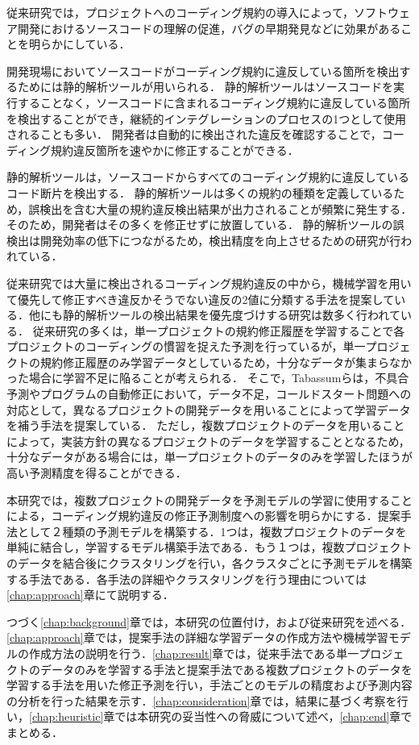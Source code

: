\documentclass[11pt,dvipdfmx]{jreport}
\begin{document}
従来研究では，プロジェクトへのコーディング規約の導入によって，ソフトウェア開発におけるソースコードの理解の促進，バグの早期発見などに効果があることを明らかにしている\cite{Beller2}\cite{Johnson}\cite{Beller}．

開発現場においてソースコードがコーディング規約に違反している箇所を検出するためには静的解析ツールが用いられる．
静的解析ツールはソースコードを実行することなく，ソースコードに含まれるコーディング規約に違反している箇所を検出することができ，継続的インテグレーションのプロセスの1つとして使用されることも多い．
開発者は自動的に検出された違反を確認することで，コーディング規約違反箇所を速やかに修正することができる．

静的解析ツールは，ソースコードからすべてのコーディング規約に違反しているコード断片を検出する．
静的解析ツールは多くの規約の種類を定義しているため，誤検出を含む大量の規約違反検出結果が出力されることが頻繁に発生する．
そのため，開発者はその多くを修正せずに放置している．
静的解析ツールの誤検出は開発効率の低下につながるため，検出精度を向上させるための研究が行われている\cite{Nguyen}．

従来研究では大量に検出されるコーディング規約違反の中から，機械学習を用いて優先して修正すべき違反かそうでない違反の2値に分類する手法を提案している\cite{JyuraiPre}．他にも静的解析ツールの検出結果を優先度づけする研究は数多く行われている．
従来研究の多くは，単一プロジェクトの規約修正履歴を学習することで各プロジェクトのコーディングの慣習を捉えた予測を行っているが，単一プロジェクトの規約修正履歴のみ学習データとしているため，十分なデータが集まらなかった場合に学習不足に陥ることが考えられる．
そこで，Tabassumらは，不具合予測やプログラムの自動修正において，データ不足，コールドスタート問題への対応として，異なるプロジェクトの開発データを用いることによって学習データを補う手法を提案している\cite{Tabassum}．
ただし，複数プロジェクトのデータを用いることによって，実装方針の異なるプロジェクトのデータを学習することとなるため，十分なデータがある場合には，単一プロジェクトのデータのみを学習したほうが高い予測精度を得ることができる．

本研究では，複数プロジェクトの開発データを予測モデルの学習に使用することによる，コーディング規約違反の修正予測制度への影響を明らかにする．提案手法として２種類の予測モデルを構築する．1つは，複数プロジェクトのデータを単純に結合し，学習するモデル構築手法である．もう１つは，複数プロジェクトのデータを結合後にクラスタリングを行い，各クラスタごとに予測モデルを構築する手法である．各手法の詳細やクラスタリングを行う理由については\ref{chap:approach}章にて説明する．

つづく\ref{chap:background}章では，本研究の位置付け，および従来研究を述べる．\ref{chap:approach}章では，提案手法の詳細な学習データの作成方法や機械学習モデルの作成方法の説明を行う．\ref{chap:result}章では，従来手法である単一プロジェクトのデータのみを学習する手法と提案手法である複数プロジェクトのデータを学習する手法を用いた修正予測を行い，手法ごとのモデルの精度および予測内容の分析を行った結果を示す．\ref{chap:consideration}章では，結果に基づく考察を行い，\ref{chap:heuristic}章では本研究の妥当性への脅威について述べ，\ref{chap:end}章でまとめる．
\end{document}
